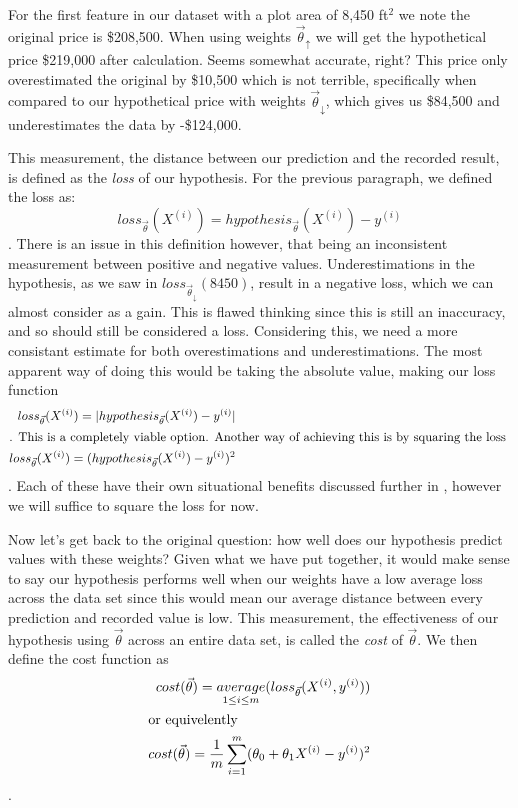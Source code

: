 For the first feature in our dataset with a plot area of 8,450 ft$^2$ we note the original price is \$208,500. When using weights $\vec\theta_{\uparrow}$ we will get the hypothetical price \$219,000 after calculation. Seems somewhat accurate, right? This price only overestimated the original by \$10,500 which is not terrible, specifically when compared to our hypothetical price  with weights $\vec\theta_{\downarrow}$, which gives us \$84,500 and underestimates the data by -\$124,000.

This measurement, the distance between our prediction and the recorded result, is defined as the \emph{loss} of our hypothesis. For the previous paragraph, we defined the loss as:
\begin{equation*}
	loss_{\vec\theta}(X^{(i)}) = hypothesis_{\vec\theta}(X^{(i)})-y^{(i)}
\end{equation*}
. There is an issue in this definition however, that being an inconsistent measurement between positive and negative values. Underestimations in the hypothesis, as we saw in $loss_{\vec\theta_{\downarrow}}(8450)$, result in a negative loss, which we can almost consider as a gain. This is flawed thinking since this is still an inaccuracy, and so should still be considered a loss. Considering this, we need a more consistant estimate for both overestimations and underestimations. The most apparent way of doing this would be taking the absolute value, making our loss function
\begin{subequations}
\begin{align}
	loss_{\vec\theta}(X^{(i)}) = |hypothesis_{\vec\theta}(X^{(i)}) - y^{(i)}| \\
	\intertext{. This is a completely viable option. Another way of achieving this is by squaring the loss }
	loss_{\vec\theta}(X^{(i)}) = (hypothesis_{\vec\theta}(X^{(i)}) - y^{(i)})^2
\end{align}
\end{subequations}
. Each of these have their own situational benefits discussed further in \placeholder, however we will suffice to square the loss for now.

Now let's get back to the original question: how well does our hypothesis predict values with these weights? Given what we have put together, it would make sense to say our hypothesis performs well when our weights have a low average loss across the data set since this would mean our average distance between every prediction and recorded value is low. This measurement, the effectiveness of our hypothesis using $\vec\theta$ across an entire data set, is called the \emph{cost} of $\vec\theta$. We then define the cost function as
\begin{subequations}
    \begin{align}
        cost(\vec\theta) =\underset {1\leq i\leq m}{average}(loss_{\vec\theta}(X^{(i)}, y^{(i)})) \\
    \intertext{or equivelently}
        cost(\vec\theta) = \frac{1}{m}\sum_{i=1}^m (\theta_0 + \theta_1X^{(i)} -
        y^{(i)})^2
    \end{align}
\end{subequations}
.

